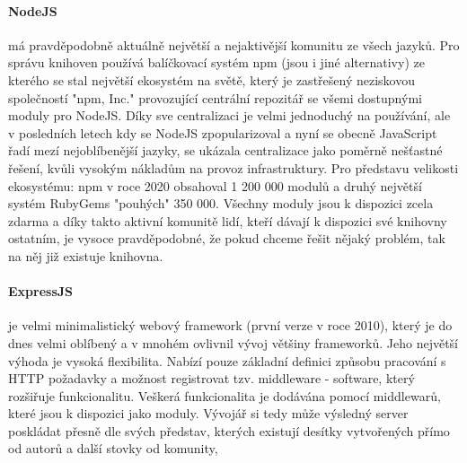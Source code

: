 \documentclass[thesis=B,czech]{FITthesis}[2019/12/23]
\begin{document}
\paragraph{NodeJS} má pravděpodobně aktuálně největší a nejaktivější komunitu ze všech jazyků. Pro správu knihoven používá balíčkovací systém npm (jsou i jiné alternativy) ze kterého se stal největší ekosystém na světě, který je zastřešený neziskovou společností "npm, Inc." provozující centrální repozitář se všemi dostupnými moduly pro NodeJS. Díky sve centralizaci je velmi jednoduchý na používání, ale v posledních letech kdy se NodeJS zpopularizoval a nyní se obecně JavaScript řadí mezí nejoblíbenější jazyky, se ukázala centralizace jako poměrně nešťastné řešení, kvůli vysokým nákladům na provoz infrastruktury. Pro představu velikosti ekosystému: npm v roce 2020 obsahoval 1 200 000 modulů a druhý největší systém RubyGems "pouhých" 350 000. Všechny moduly jsou k dispozici zcela zdarma a díky takto aktivní komunitě lidí, kteří dávají k dispozici své knihovny ostatním, je vysoce pravděpodobné, že pokud chceme řešit nějaký problém, tak na něj již existuje knihovna.

\paragraph{ExpressJS} je velmi minimalistický webový framework (první verze v roce 2010), který je do dnes velmi oblíbený a v mnohém ovlivnil vývoj většiny frameworků. Jeho největší výhoda je vysoká flexibilita. Nabízí pouze základní definici způsobu pracování s HTTP požadavky a možnost registrovat tzv. middleware - software, který rozšiřuje funkcionalitu. Veškerá funkcionalita je dodávána pomocí middlewarů, které jsou k dispozici jako moduly. Vývojář si tedy může výsledný server poskládat přesně dle svých představ, kterých existují desítky vytvořených přímo od autorů a další stovky od komunity,
\end{document}
